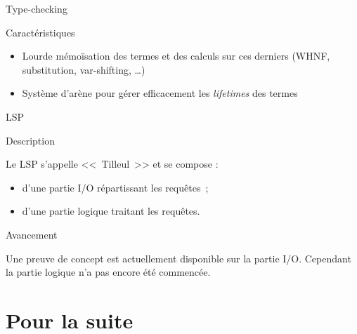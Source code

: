 \documentclass[12pt, aspectratio=169]{beamer}
\begin{document}
        \begin{frame}{Type-checking}
            
            \begin{block}{Caractéristiques}
                
                \begin{itemize}
                    \item Lourde mémoïsation des termes et des calculs sur ces derniers (WHNF, substitution, var-shifting, \dots) \pause
                    \item Système d'arène pour gérer efficacement les \textit{lifetimes} des termes
                \end{itemize}

            \end{block}

        \end{frame}

        \begin{frame}{LSP}
            
            \begin{block}{Description}
                
                Le LSP s'appelle <<~Tilleul~>> et se compose :

                \begin{itemize}
                    \item d'une partie I/O répartissant les requêtes~;
                    \item d'une partie logique traitant les requêtes.
                \end{itemize}

            \end{block}

            \vfill
            \pause

            \begin{block}{Avancement}
                
                Une preuve de concept est actuellement disponible sur la partie I/O. Cependant la partie logique n'a pas encore été commencée.

            \end{block}

        \end{frame}

    \section{Pour la suite}
\end{document}
